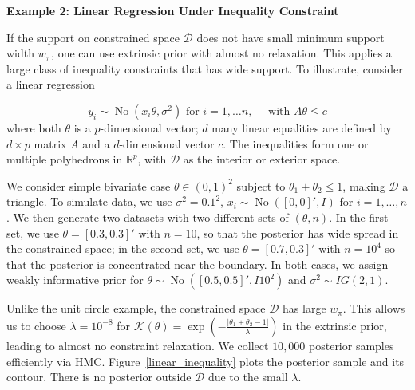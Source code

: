 \documentclass[10pt]{article}
\newcommand{\mc}[1]{\mathcal{#1}}
\DeclareMathOperator{\No}{No}
\DeclareMathOperator{\1}{\mathbbm{1}}
\begin{document}
{\bf Example 2: Linear Regression Under Inequality Constraint}

If the support on constrained space $\mc D$ does not have small minimum support width $w_\pi$, one can use extrinsic prior with almost no relaxation. This applies a large class of inequality constraints that has wide support. To illustrate, consider a linear regression

$$y_i \sim \No (x_i \theta, \sigma^2) \text{ for } i=1,\ldots n, \quad\text{ with } A\theta \le c$$
where both $\theta$ is a $p$-dimensional vector; $d$ many linear equalities are defined by $d\times p$ matrix  $A$ and a $d$-dimensional vector $c$. The inequalities form one or multiple polyhedrons in $\mathbb R^p$, with $\mc D$ as the interior or exterior space.

We consider simple bivariate case $\theta \in (0,1)^2$ subject to $\theta_1+\theta_2\le 1$, making $\mc D$ a triangle. To simulate data, we use $\sigma^2=0.1^2$, $x_i\sim \No([0,0]',I)$ for $i=1,\ldots,n$. We then generate two datasets with two different sets of $(\theta,n)$. In the first set, we use $\theta=[0.3,0.3]'$ with $n=10$, so that the posterior has wide spread in the constrained space; in the second set, we use $\theta=[0.7,0.3]'$ with $n=10^4$ so that the posterior is concentrated near the boundary. In both cases, we assign weakly informative prior for $\theta\sim \No([0.5, 0.5]',I10^2)$ and $\sigma^2\sim IG(2,1)$.

Unlike the unit circle example, the constrained space $\mc D$ has large $w_\pi$. This allows us to choose $\lambda=10^{-8}$ for $\mc K(\theta)=\exp( - \frac{|\theta_1+\theta_2-1|}{\lambda})$ in the extrinsic prior, leading to almost no constraint relaxation. We collect $10,000$ posterior samples efficiently via HMC. Figure~\ref{linear_inequality} plots the posterior sample and its contour. There is no posterior outside $\mc D$ due to the small $\lambda$.
\end{document}
